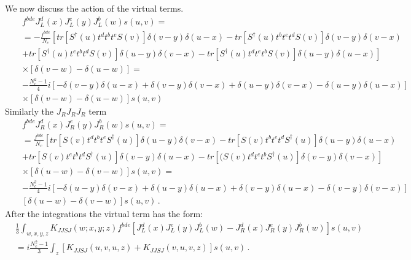 \documentclass[11pt,a4paper]{article}
\begin{document}
We now discuss the action of the virtual terms.
\begin{eqnarray}\label{LLL}
&&f^{bde}J_{L}^{d}(x)J_{L}^{e}(y)J_{L}^{b}(w)s(u,v)=\nonumber \\
&&=-\frac{f^{bde}}{N_{c}}\left[tr\left[S^{\dagger}(u)t^{d}t^{b}t^{e}S(v)\right]\delta(v-y)\delta(u-x)-tr\left[S^{\dagger}(u)t^{b}t^{e}t^{d}S(v)\right]\delta(v-y)\delta(v-x)\right.\nonumber \\
&&\left.+tr\left[S^{\dagger}(u)t^{e}t^{b}t^{d}S(v)\right]\delta(u-y)\delta(v-x)-tr\left[S^{\dagger}(u)t^{d}t^{e}t^{b}S(v)\right]\delta(u-y)\delta(u-x)\right]\nonumber \\
&&\times \left[\delta(v-w)-\delta(u-w)\right]=\nonumber \\
&&-\frac{N_{c}^{2}-1}{4}i\left[-\delta(v-y)\delta(u-x)+\delta(v-y)\delta(v-x)+\delta(u-y)\delta(v-x)-\delta(u-y)\delta(u-x)\right]\nonumber \\
&&\times \left[\delta(v-w)-\delta(u-w)\right]s(u,v)
 \end{eqnarray}
 Similarly  the $J_RJ_RJ_R$ term
 \begin{eqnarray}\label{RRR}
&&f^{bde}J_{R}^{d}(x)J_{R}^{e}(y)J_{R}^{b}(w)s(u,v)=\nonumber \\
&&=\frac{f^{bde}}{N_{c}}\left[tr\left[S(v)t^{d}t^{b}t^{e}S^{\dagger}(u)\right]\delta(u-y)\delta(v-x)-tr\left[S(v)t^{b}t^{e}t^{d}S^{\dagger}(u)\right] \delta(u-y)\delta(u-x)\right.\nonumber \\
&&\left.+tr\left[S(v)t^{e}t^{b}t^{d}S^{\dagger}(u)\right]\delta(v-y)\delta(u-x)-tr\left[(S(v)t^{d}t^{e}t^{b}S^{\dagger}(u)\right]\delta(v-y)\delta(v-x)\right]\nonumber \\
&&\times \left[\delta(u-w)-\delta(v-w)\right]s(u,v)=\nonumber \\
&&-\frac{N_{c}^{2}-1}{4}i\left[-\delta(u-y)\delta(v-x)+\delta(u-y)\delta(u-x)+\delta(v-y)\delta(u-x)-\delta(v-y)\delta(v-x)\right]\nonumber \\
&&\left[\delta(u-w)-\delta(v-w)\right]s(u,v)\,.
\end{eqnarray}
After the integrations the virtual term has the form:
\begin{equation}\begin{split}
&\frac{1}{3}\int_{w,x,y,z}K_{JJSJ}(w;x,y;z)f^{bde}\left[J_{L}^{d}(x)J_{L}^{e}(y)J_{L}^{b}(w)-J_{R}^{d}(x)J_{R}^{e}(y)J_{R}^{b}(w)\right]s(u,v)\\
&=i\frac{N_{c}^{2}-1}{3}\int_{z}[K_{JJSJ}(u,v,u,z)+K_{JJSJ}(v,u,v,z) ]s(u,v)\,. \\
 \end{split}\end{equation}
\end{document}
